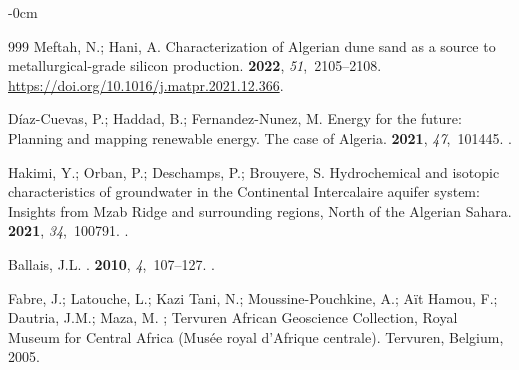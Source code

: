 \documentclass[asi,article,accept,pdftex,moreauthors]{Definitions/mdpi}
\begin{document}
\begin{adjustwidth}{-\extralength}{0cm}
\begin{thebibliography}{999}
Meftah, N.; Hani, A.
\newblock Characterization of Algerian dune sand as a source to
  metallurgical-grade silicon production.
 {\bf 2022}, {\em 51},~2105--2108. %
  {\url{https://doi.org/10.1016/j.matpr.2021.12.366}}.

Díaz-Cuevas, P.; Haddad, B.; Fernandez-Nunez, M.
\newblock Energy for the future: Planning and mapping renewable energy. The
  case of Algeria.
 {\bf 2021},
  {\em 47},~101445.
.

Hakimi, Y.; Orban, P.; Deschamps, P.; Brouyere, S.
\newblock Hydrochemical and isotopic characteristics of groundwater in the
  Continental Intercalaire aquifer system: Insights from Mzab Ridge and
  surrounding regions, North of the Algerian Sahara.
 {\bf 2021}, {\em
  34},~100791.
.

Ballais, J.L.
.
 {\bf 2010}, {\em 4},~107--127.
.

Fabre, J.; Latouche, L.; {Kazi Tani}, N.; {Moussine-Pouchkine}, A.; {Aït
  Hamou}, F.; Dautria, J.M.; Maza, M.
; Tervuren African
  Geoscience Collection, Royal Museum for Central Africa (Musée royal d’Afrique centrale). Tervuren, Belgium, %
  2005.


\end{thebibliography}
\end{adjustwidth}
\end{document}
